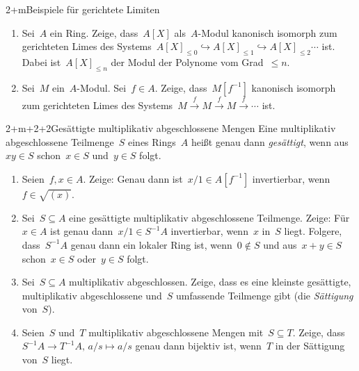\documentclass{uebblatt}
\begin{document}

\begin{aufgabe}{2+m}{Beispiele für gerichtete Limiten}
\begin{enumerate}
\item Sei~$A$ ein Ring. Zeige, dass~$A[X]$ als~$A$-Modul kanonisch isomorph zum
gerichteten Limes des Systems~$A[X]_{\leq0} \hookrightarrow A[X]_{\leq1}
\hookrightarrow A[X]_{\leq2} \cdots$ ist. Dabei ist~$A[X]_{\leq n}$ der Modul
der Polynome vom Grad~$\leq n$.
\item Sei~$M$ ein~$A$-Modul. Sei~$f \in A$. Zeige, dass~$M[f^{-1}]$ kanonisch
isomorph zum gerichteten Limes des Systems~$M \xrightarrow{f} M \xrightarrow{f}
M \xrightarrow{f} \cdots$ ist.
\end{enumerate}
\end{aufgabe}

\begin{aufgabe}{2+m+2+2}{Gesättigte multiplikativ abgeschlossene Mengen}
Eine multiplikativ abgeschlossene Teilmenge~$S$ eines Rings~$A$ heißt genau dann
\emph{gesättigt}, wenn aus~$xy \in S$ schon~$x \in S$ und~$y \in S$ folgt.
\begin{enumerate}
\item Seien~$f, x \in A$.
Zeige: Genau dann ist~$x/1 \in A[f^{-1}]$
invertierbar, wenn~$f \in \sqrt{(x)}$.
\item Sei~$S \subseteq A$ eine gesättigte multiplikativ abgeschlossene
Teilmenge.
Zeige: Für~$x \in A$ ist genau dann~$x/1 \in S^{-1}A$ invertierbar,
wenn~$x$ in~$S$ liegt.
Folgere, dass~$S^{-1}A$ genau dann ein lokaler Ring ist, wenn~$0 \not\in S$ und aus~$x + y \in S$
schon~$x \in S$ oder~$y \in S$ folgt.
\item Sei~$S \subseteq A$ multiplikativ abgeschlossen.
Zeige, dass es eine kleinste gesättigte, mul\-ti\-pli\-ka\-tiv abgeschlossene und~$S$
umfassende Teilmenge gibt (die \emph{Sättigung} von~$S$). 
\item Seien~$S$ und~$T$ multiplikativ abgeschlossene Mengen mit~$S \subseteq
T$. Zeige, dass~$S^{-1}A \to T^{-1}A,\,a/s \mapsto a/s$ genau
dann bijektiv ist, wenn~$T$ in der Sättigung von~$S$ liegt.
\end{enumerate}
\end{aufgabe}
\end{document}
